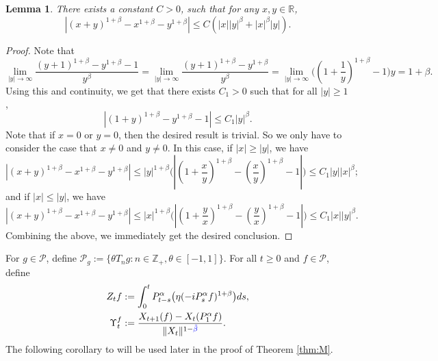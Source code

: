 \documentclass[12pt,a4paper]{amsart}
\theoremstyle{plain}
\newtheorem{lem}[thm]{Lemma}
\theoremstyle{definition}
\numberwithin{equation}{section}
\begin{document}
\begin{lem}\label{ineq: analysis}
There exists a constant $C>0$, such that for any $x,y \in \mathbb R$,
\[
    |(x+y)^{1+\beta}-x^{1+\beta}-y^{1+\beta}|\leq C(|x||y|^{\beta}+|x|^{\beta}|y|).
\]
\end{lem}
\begin{proof}
   Note that
\[
  \lim_{|y|\rightarrow \infty}\frac{(y+1)^{1+\beta}-y^{1+\beta}-1}{y^{\beta}}=\lim_{|y|\rightarrow \infty}\frac{(y+1)^{1+\beta}-y^{1+\beta}}{y^{\beta}}=\lim_{|y|\rightarrow \infty}\big((1+\frac{1}{y})^{1+\beta}-1\big)y = 1+\beta.
\]
{\color{red}Using} this and continuity, we get that there exists $C_1>0$ such that for all {\color{red}$|y|\geq 1$},
\[
  |(1+y)^{1+\beta}-y^{1+\beta}-1|\leq C_1 |y|^{\beta}.
\]
{\color{red} Note that if $x = 0$ or $y= 0$, then the desired result is trivial. So we only have to consider the case that $x \neq 0$ and $y \neq 0$.}
{\color{red} In this case}, {\color{red}if $|x|\geq |y|$}, we have
\[
|(x+y)^{1+\beta}-x^{1+\beta}-y^{1+\beta}|\leq |y|^{1+\beta}\Big(|(1+\frac{x}{y})^{1+\beta}-(\frac{x}{y})^{1+\beta}-1|\Big)\leq C_1|y||x|^{\beta};
\]
and {\color{red} if $|x|\leq |y|$}, we have
\[
|(x+y)^{1+\beta}-x^{1+\beta}-y^{1+\beta}|\leq |x|^{1+\beta}\Big(|(1+\frac{y}{x})^{1+\beta}-(\frac{y}{x})^{1+\beta}-1|\Big)\leq C_1|x||y|^{\beta}.
\]
Combining the above, we immediately get the desired conclusion.
\end{proof}

For $g\in \mathcal P$, define $\mathcal P_g:= \{\theta T_ng:n \in \mathbb Z_+, \theta \in [-1,1]\}$. 	For all $t\geq 0$ and $f\in \mathcal P$, define
	\begin{align}
  	Z_t f
  	&:= \int_0^t P^\alpha_{t-s}\big( \eta (-i P^\alpha_sf)^{1+\beta}\big)ds,\\
  	\Upsilon^f_t
   & := \frac{X_{t+1} (f) - X_t(P_1^\alpha f)}{\| X_t\|^{1-{\color{blue}\tilde \beta}}}.
  	\end{align}
The following corollary to  \cite[Proposition 3.5]{RenSongSunZhao2019Stable} will be used later in the proof of Theorem \ref{thm:M}.
\end{document}
